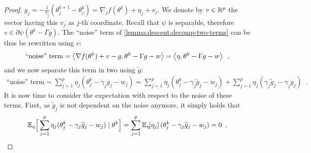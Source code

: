 \begin{proof}
  $g_j = - \frac{1}{\gamma_j} (\theta_j^{k+1} - \theta_j^k) = \nabla_j f(\theta^k) + \eta_j + v_j$.
  We denote by $v \in \mathbb R^p$ the vector having this $v_j$ as $j$-th coordinate.
  Recall that $\psi$ is separable, therefore $v \in \partial \psi(\theta^k - \Gamma g)$.
  The ``noise'' term of \eqref{lemma:descent:decomp-two-terms} can be thus
  be rewritten using $v$:
  \begin{align}
    \text{``noise'' term}
    = \left\langle \nabla f(\theta^k) + v - g, \theta^k- \Gamma g - w \right\rangle
    = \left\langle \eta, \theta^k- \Gamma g - w \right\rangle\enspace,
  \end{align}
  and we now separate this term in two using $\widetilde g$:
  \begin{align}
    \text{``noise'' term}
    = \sum_{j=1}^p \eta_j (\theta^k_j - \gamma_j g_j - w_j)
    = \sum_{j=1}^p \eta_j (\theta^k_j - \gamma_j \widetilde g_j - w_j)
    + \sum_{j=1}^p \eta_j (\gamma_j \widetilde g_j - \gamma_j g_j)\enspace. \label{lemma:descent:noise-term-two-terms}
  \end{align}
  It is now time to consider the expectation with respect to the noise of
  these terms.
  First, as $\widetilde g_j$ is not dependent on the noise anymore, it simply
  holds that
  \begin{align}
    \mathbb E_{\eta}\Big[\sum_{j=1}^p \eta_j (\theta^k_j - \gamma_j \widetilde g_j - w_j) \mid \theta^k \Big]
    = \sum_{j=1}^p \mathbb E_{\eta} \hspace{-0.29em} \left[ \eta_j \right] (\theta^k_j - \gamma_j \widetilde g_j - w_j)
    = 0\enspace. \label{lemma:descent:noise-term-zero-upper-bound}
  \end{align}


\end{proof}
